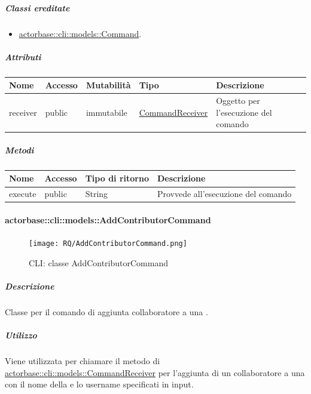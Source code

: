 \documentclass{scalatekids-article}
\begin{document}
\subparagraph{Classi ereditate}

\begin{itemize}
\item \hyperref[sec:actorbase::cli::models::Command]{actorbase::cli::models::Command}.
\end{itemize}

\subparagraph{Attributi}

\begin{tabular}{| p{1cm} | p{1.5cm} | p{2cm} | p{4cm} | p{8.5cm} |}
  \hline
  Nome & Accesso & Mutabilità & Tipo & Descrizione\\
  \hline
  receiver & public & immutabile & \hyperref[sec:actorbase::cli::models::CommandReceiver]{CommandReceiver} & Oggetto per l'esecuzione del comando\\
  \hline
\end{tabular}

\subparagraph{Metodi}

\begin{tabular}{| l | l | l | l |}
  \hline
  Nome & Accesso & Tipo di ritorno & Descrizione\\
  \hline
  execute & public & String & Provvede all'esecuzione del comando\\
  \hline
\end{tabular}

\paragraph{actorbase::cli::models::AddContributorCommand}
\label{sec:actorbase::cli::models::AddContributorCommand}

\begin{figure}[H]
  \begin{center}
    \texttt{[image: RQ/AddContributorCommand.png]}
    \caption{CLI: classe AddContributorCommand}
  \end{center}
\end{figure}

\subparagraph{Descrizione}

Classe per il comando di aggiunta collaboratore a una .

\subparagraph{Utilizzo}

Viene utilizzata per chiamare il metodo di
\hyperref[sec:actorbase::cli::models::CommandReceiver]{actorbase::cli::models::CommandReceiver} per l'aggiunta di un collaboratore a
una  con il nome della  e lo username specificati
in input.
\end{document}
